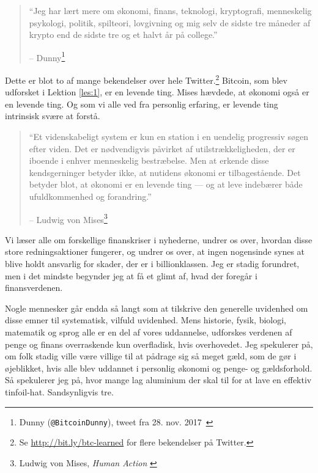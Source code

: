 \begin{quotation}\begin{samepage}
\enquote{Jeg har lært mere om økonomi, finans, teknologi, kryptografi, 
menneskelig psykologi, politik, spilteori, lovgivning og mig selv de sidste 
tre måneder af krypto end de sidste tre og et halvt år på college.}
\begin{flushright} -- Dunny\footnote{Dunny (\texttt{@BitcoinDunny}), tweet fra 
    28. nov. 2017~\cite{bitcoindunny-tweet}}
\end{flushright}\end{samepage}\end{quotation}

Dette er blot to af mange bekendelser over hele Twitter.\footnote{Se 
\url{http://bit.ly/btc-learned} for flere bekendelser på Twitter.} Bitcoin, 
som blev udforsket i Lektion \ref{les:1}, er en levende ting. Mises hævdede, 
at økonomi også er en levende ting. Og som vi alle ved fra personlig erfaring, 
er levende ting intrinsisk svære at forstå.

\begin{quotation}\begin{samepage}
\enquote{Et videnskabeligt system er kun en station i en uendelig progressiv
søgen efter viden. Det er nødvendigvis påvirket af utilstrækkeligheden, der er 
iboende i enhver menneskelig bestræbelse. Men at erkende disse kendsgerninger
betyder ikke, at nutidens økonomi er tilbagestående. Det betyder blot, at
økonomi er en levende ting --- og at leve indebærer både ufuldkommenhed
og forandring.}
\begin{flushright} -- Ludwig von Mises\footnote{Ludwig von Mises, 
    \textit{Human Action}
\cite{human-action}}
\end{flushright}\end{samepage}\end{quotation}

\newpage

Vi læser alle om forskellige finanskriser i nyhederne, undrer os over, hvordan 
disse store redningsaktioner fungerer, og undrer os over, at ingen nogensinde 
synes at blive holdt ansvarlig for skader, der er i billionklassen. Jeg er 
stadig forundret, men i det mindste begynder jeg at få et glimt af, hvad der 
foregår i finansverdenen.

Nogle mennesker går endda så langt som at tilskrive den generelle uvidenhed om 
disse emner til systematisk, vilfuld uvidenhed. Mens historie, fysik, biologi, 
matematik og sprog alle er en del af vores uddannelse, udforskes verdenen af 
penge og finans overraskende kun overfladisk, hvis overhovedet. Jeg spekulerer 
på, om folk stadig ville være villige til at pådrage sig så meget gæld, som de 
gør i øjeblikket, hvis alle blev uddannet i personlig økonomi og penge- og 
gældsforhold. Så spekulerer jeg på, hvor mange lag aluminium der skal til for 
at lave en effektiv tinfoil-hat. Sandsynligvis tre.

